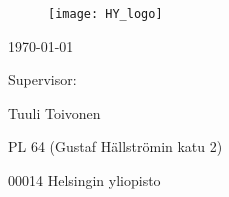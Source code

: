 \begin{titlepage}{
    \centering
    \begin{figure}[t]
    \centering
    \texttt{[image: HY\_logo]}
    \end{figure}
    
    \mythesis \par
    \mygeography \par
    \mygis \par
    
    \bigskip
    \MakeUppercase{\mytitle}
    
    \bigskip
    \myname
    
    \mydate\today
    
    \vfill
    
    Supervisor: \par
    Tuuli Toivonen \par
    \bigskip
    \bigskip
    \MakeUppercase\myuni \par
    \MakeUppercase\myfaculty \par
    \MakeUppercase\mydept \par
    \MakeUppercase{\mygeography} \par
    PL 64 (Gustaf Hällströmin katu 2) \par
    00014 Helsingin yliopisto \par
}
\end{titlepage}